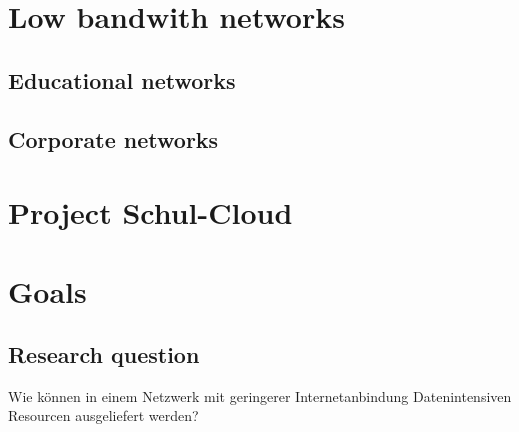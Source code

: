 \section{Low bandwith networks}
\subsection{Educational networks}
\subsection{Corporate networks}

\section{Project Schul-Cloud}

\section{Goals}
\subsection{Research question}
Wie können in einem Netzwerk mit geringerer Internetanbindung Datenintensiven Resourcen ausgeliefert werden?
